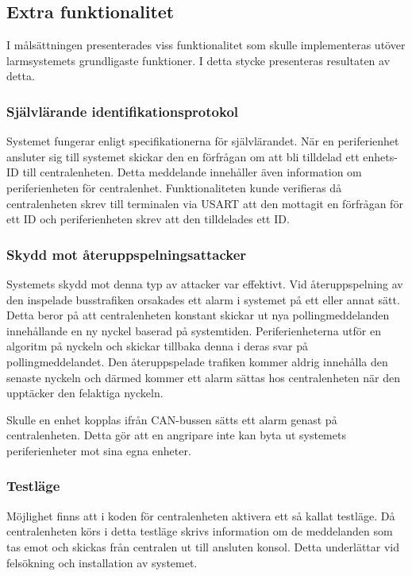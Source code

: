 \documentclass[a4paper]{article}
\begin{document}
\subsection{Extra funktionalitet}
I målsättningen presenterades viss funktionalitet som skulle implementeras utöver larmsystemets grundligaste funktioner.
I detta stycke presenteras resultaten av detta.

\subsubsection{Självlärande identifikationsprotokol}
Systemet fungerar enligt specifikationerna för självlärandet.
När en periferienhet ansluter sig till systemet skickar den en förfrågan om att bli tilldelad ett enhets-ID till centralenheten.
Detta meddelande innehåller även information om periferienheten för centralenhet.
Funktionaliteten kunde verifieras då centralenheten skrev till terminalen via USART att den mottagit en förfrågan för ett ID och periferienheten skrev att den tilldelades ett ID.

\subsubsection{Skydd mot återuppspelningsattacker}
Systemets skydd mot denna typ av attacker var effektivt.
Vid återuppspelning av den inspelade busstrafiken orsakades ett alarm i systemet på ett eller annat sätt.
Detta beror på att centralenheten konstant skickar ut nya pollingmeddelanden innehållande en ny nyckel baserad på systemtiden.
Periferienheterna utför en algoritm på nyckeln och skickar tillbaka denna i deras svar på pollingmeddelandet.
Den återuppspelade trafiken kommer aldrig innehålla den senaste nyckeln och därmed kommer ett alarm sättas hos centralenheten när den upptäcker den felaktiga nyckeln.

Skulle en enhet kopplas ifrån CAN-bussen sätts ett alarm genast på centralenheten.
Detta gör att en angripare inte kan byta ut systemets periferienheter mot sina egna enheter.

\subsubsection{Testläge}
Möjlighet finns att i koden för centralenheten aktivera ett så kallat testläge.
Då centralenheten körs i detta testläge skrivs information om de meddelanden som tas emot och skickas från centralen ut till ansluten konsol.
Detta underlättar vid felsökning och installation av systemet.
\end{document}
